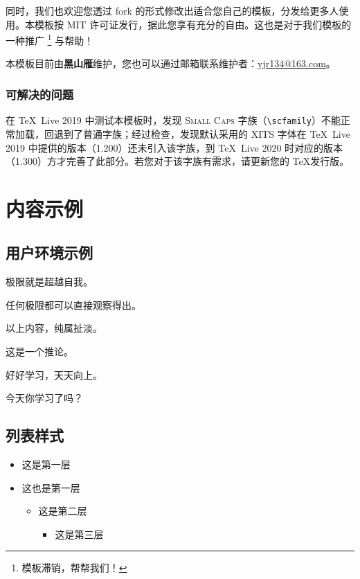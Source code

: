 \documentclass[
  10pt,
  twoside,
  openany,
  b5paper, %
  colorscheme = rbb, %
  xits = false,
]{qyxf-book}
\begin{document}
同时，我们也欢迎您透过 fork 的形式修改出适合您自己的模板，分发给更多人使用。本模板按 MIT 许可证发行，据此您享有充分的自由。这也是对于我们模板的一种推广
\footnote{模板滞销，帮帮我们！}
与帮助！

本模板目前由\textbf{黑山雁}维护，您也可以通过邮箱联系维护者：\url{yjr134@163.com}。

\subsection{可解决的问题}

在 \TeX\ Live 2019 中测试本模板时，发现 \textsc{Small Caps} 字族（\verb|\scfamily|）不能正常加载，回退到了普通字族；经过检查，发现默认采用的 XITS 字体在 \TeX\ Live 2019 中提供的版本（1.200）还未引入该字族，到 \TeX\ Live 2020 时对应的版本（1.300）方才完善了此部分。若您对于该字族有需求，请更新您的 \TeX 发行版。

\chapter{内容示例}
\section{用户环境示例}

\begin{define}
  极限就是超越自我。
\end{define}

\begin{theorem}
  任何极限都可以直接观察得出。
\end{theorem}

\begin{lemma}
  以上内容，纯属扯淡。
\end{lemma}

\begin{corollary}
 这是一个推论。
\end{corollary}

\begin{note}
  好好学习，天天向上。
\end{note}

\begin{alert}
  今天你学习了吗？
\end{alert}

\section{列表样式}
\begin{itemize}
  \item 这是第一层
  \item 这也是第一层
  \begin{itemize}
    \item 这是第二层
    \begin{itemize}
      \item 这是第三层
    \end{itemize}
  \end{itemize}
\end{itemize}
\end{document}
